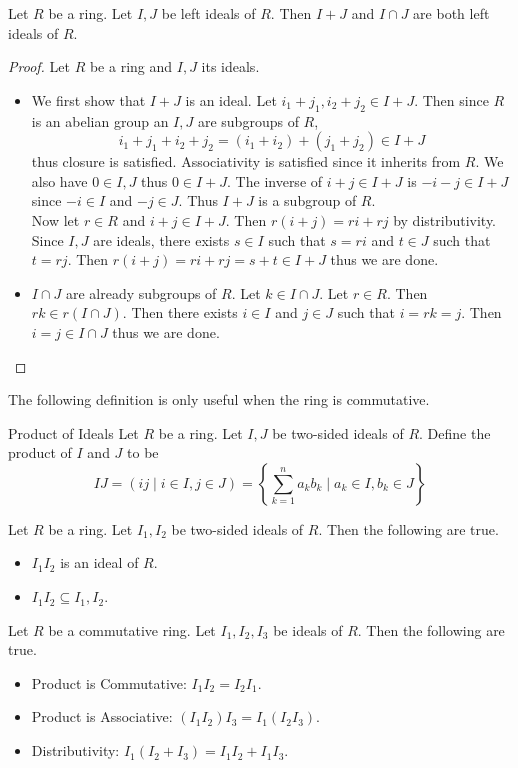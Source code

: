 \documentclass[a4paper]{article}
\begin{document}
\begin{prp}{}{} Let $R$ be a ring. Let $I,J$ be left ideals of $R$. Then $I+J$ and $I\cap J$ are both left ideals of $R$. 
\begin{proof}
Let $R$ be a ring and $I,J$ its ideals. 
\begin{itemize}
\item We first show that $I+J$ is an ideal. Let $i_1+j_1,i_2+j_2\in I+J$. Then since $R$ is an abelian group an $I,J$ are subgroups of $R$, $$i_1+j_1+i_2+j_2=(i_1+i_2)+(j_1+j_2)\in I+J$$ thus closure is satisfied. Associativity is satisfied since it inherits from $R$. We also have $0\in I,J$ thus $0\in I+J$. The inverse of $i+j\in I+J$ is $-i-j\in I+J$ since $-i\in I$ and $-j\in J$. Thus $I+J$ is a subgroup of $R$. \\
Now let $r\in R$ and $i+j\in I+J$. Then $r(i+j)=ri+rj$ by distributivity. Since $I,J$ are ideals, there exists $s\in I$ such that $s=ri$ and $t\in J$ such that $t=rj$. Then $r(i+j)=ri+rj=s+t\in I+J$ thus we are done. 
\item $I\cap J$ are already subgroups of $R$. Let $k\in I\cap J$. Let $r\in R$. Then $rk\in r(I\cap J)$. Then there exists $i\in I$ and $j\in J$ such that $i=rk=j$. Then $i=j\in I\cap J$ thus we are done. 
\end{itemize}
\end{proof}
\end{prp}

The following definition is only useful when the ring is commutative. 

\begin{defn}{Product of Ideals}{} Let $R$ be a ring. Let $I,J$ be two-sided ideals of $R$. Define the product of $I$ and $J$ to be $$IJ=(ij\;|\;i\in I, j\in J)=\left\{\sum_{k=1}^na_kb_k\;|\;a_k\in I,b_k\in J\right\}$$
\end{defn}

\begin{lmm}{}{} Let $R$ be a ring. Let $I_1,I_2$ be two-sided ideals of $R$. Then the following are true. 
\begin{itemize}
\item $I_1I_2$ is an ideal of $R$. 
\item $I_1I_2\subseteq I_1,I_2$. 
\end{itemize}
\end{lmm}

\begin{lmm}{}{} Let $R$ be a commutative ring. Let $I_1,I_2,I_3$ be ideals of $R$. Then the following are true. 
\begin{itemize}
\item Product is Commutative: $I_1I_2=I_2I_1$. 
\item Product is Associative: $(I_1I_2)I_3=I_1(I_2I_3)$. 
\item Distributivity: $I_1(I_2+I_3)=I_1I_2+I_1I_3$. 
\end{itemize}
\end{lmm}
\end{document}
